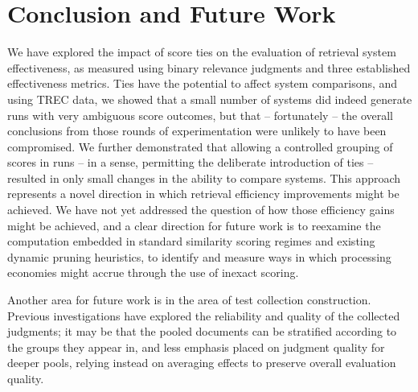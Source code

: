 \section{Conclusion and Future Work}
\label{sec-conclusion}

We have explored the impact of score ties on the evaluation of
retrieval system effectiveness, as measured using binary relevance
judgments and three established effectiveness metrics.
Ties have the potential to affect system comparisons, and using TREC
data, we showed that a small number of systems did indeed generate
runs with very ambiguous score outcomes, but that -- fortunately --
the overall conclusions from those rounds of experimentation were
unlikely to have been compromised.
We further demonstrated that allowing a controlled grouping of scores
in runs -- in a sense, permitting the deliberate introduction of ties
-- resulted in only small changes in the ability to compare systems.
This approach represents a novel direction in which retrieval
efficiency improvements might be achieved.
We have not yet addressed the question of how those efficiency gains
might be achieved, and a clear direction for future work is to
reexamine the computation embedded in standard similarity scoring
regimes and existing dynamic pruning heuristics, to identify and
measure ways in which processing economies might accrue through the
use of inexact scoring.

Another area for future work is in the area of test collection
construction.
Previous investigations
{\citep{voorhees00ipm,bcstvy08sigir,sst11sigir}} have explored the
reliability and quality of the collected judgments; it may be that
the pooled documents can be stratified according to the groups they
appear in, and less emphasis placed on judgment quality for deeper
pools, relying instead on averaging effects to preserve overall
evaluation quality.

